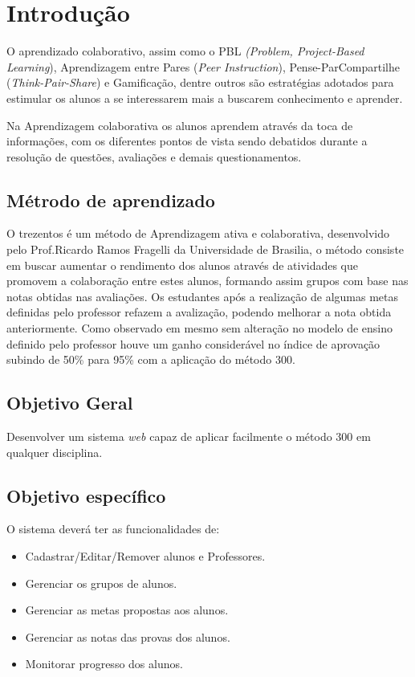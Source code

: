 \chapter[Introdução]{Introdução}
O aprendizado colaborativo, assim como o PBL \textit{(Problem,
Project-Based Learning}), Aprendizagem entre Pares (\textit{Peer Instruction}), Pense-ParCompartilhe (\textit{Think-Pair-Share}) e Gamificação, dentre outros são estratégias adotados para estimular os alunos a se interessarem mais a buscarem conhecimento e aprender.

Na Aprendizagem colaborativa os alunos aprendem através da toca de informações, com os diferentes pontos de vista sendo debatidos durante a resolução de questões, avaliações e demais questionamentos. \cite{lupion2004grupos}

\section{Métrodo de aprendizado}
O trezentos é um método de Aprendizagem ativa e colaborativa, desenvolvido pelo Prof.Ricardo Ramos Fragelli da Universidade de Brasilia, o método consiste em buscar aumentar o rendimento dos alunos através de atividades que promovem a colaboração entre estes alunos, formando assim grupos com base nas notas obtidas nas avaliações. Os estudantes após a realização de algumas metas definidas pelo professor refazem a avalização, podendo melhorar a nota obtida anteriormente. Como observado em \cite{ramos2017trezentos} mesmo sem alteração no modelo de ensino definido pelo professor houve um ganho considerável no índice de aprovação subindo de 50\% para 95\% com a aplicação do método 300.


\section{Objetivo Geral}
Desenvolver um sistema \textit{web} capaz de aplicar facilmente o método 300 em qualquer disciplina.

\section{Objetivo específico}
O sistema deverá ter as funcionalidades de:
\begin{itemize}
    \item Cadastrar/Editar/Remover alunos e Professores.
    \item Gerenciar os grupos de alunos.
    \item Gerenciar as metas propostas aos alunos.
    \item Gerenciar as notas das provas dos alunos.
    \item Monitorar progresso dos alunos.
\end{itemize}